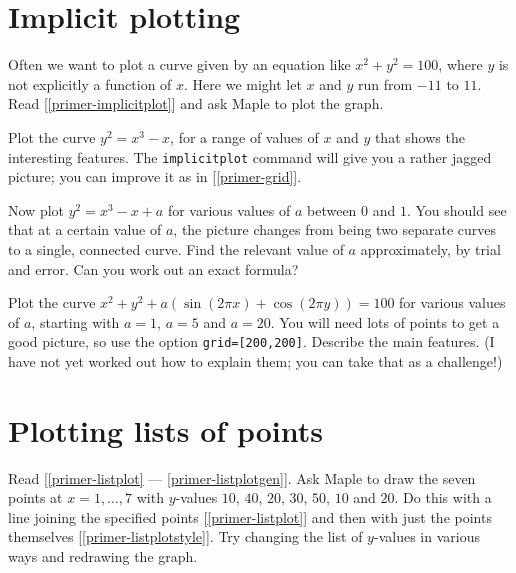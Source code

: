 \documentclass[a4paper,10pt]{amsbook}
\begin{document}
\section{Implicit plotting}


Often we want to plot a curve given by an equation like
$x^2+y^2=100$, where $y$ is not explicitly a function of
$x$.  Here we might let $x$ and $y$ run from $-11$ to $11$.
Read [\ref{primer-implicitplot}] and ask Maple to plot the
graph. 

\begin{exercise}
 Plot the curve $y^2=x^3-x$, for a range of values of $x$
 and $y$ that shows the interesting features.  The
 \verb~implicitplot~ command will give you a rather jagged
 picture; you can improve it as in [\ref{primer-grid}].

 Now plot $y^2=x^3-x+a$ for various values of $a$ between
 $0$ and $1$.  You should see that at a certain value of
 $a$, the picture changes from being two separate curves to
 a single, connected curve.  Find the relevant value of $a$
 approximately, by trial and error.  Can you work out an
 exact formula? 
\end{exercise}

\begin{exercise}
 Plot the curve $x^2+y^2+a(\sin(2\pi x)+\cos(2\pi y))=100$ for
 various values of $a$, starting with $a=1$, $a=5$ and
 $a=20$.  You will need lots of points to get a good
 picture, so use the option \verb~grid=[200,200]~.  Describe
 the main features.  (I have not yet  worked out how to
 explain them; you can take that as a challenge!) 
\end{exercise}

\section{Plotting lists of points}

\begin{exercise}\label{ex-listplot}
 Read [\ref{primer-listplot} --- \ref{primer-listplotgen}].  Ask Maple
 to draw the seven points at $x=1,\dotsc,7$ with $y$-values
 $10$, $40$, $20$, $30$, $50$, $10$ and $20$.  Do this with
 a line joining the specified points [\ref{primer-listplot}]
 and then with just the points themselves
 [\ref{primer-listplotstyle}].  Try changing the list of
 $y$-values in various ways and redrawing the graph.
\end{exercise}
\end{document}
